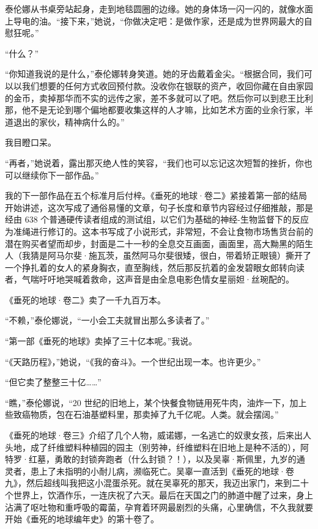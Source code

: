 \documentclass[AutoFakeBold=true]{book}
\begin{document}
泰伦娜从书桌旁站起身，走到地毯圆圈的边缘。她的身体场一闪一闪的，就像水面上导电的油。``接下来，''她说，``你做决定吧：是做作家，还是成为世界网最大的自慰狂呢。''

``什么？''

``你知道我说的是什么，''泰伦娜转身笑道。她的牙齿戴着金尖。``根据合同，我们可以以我们想要的任何方式收回预付款。没收你在银联的资产，收回你藏在自由家园的金币，卖掉那华而不实的远传之家，差不多就可以了吧。然后你可以到悲王比利那，他不是无论到哪个偏地都要收集这样的人才嘛，比如艺术方面的业余行家，半道退出的家伙，精神病什么的。''

我目瞪口呆。

``再者，''她说着，露出那灭绝人性的笑容，``我们也可以忘记这次短暂的挫折，你也可以继续你下一部作品。''

我的下一部作品在五个标准月后付梓。《垂死的地球·卷二》紧接着第一部的结局开始讲述，这次写成了通俗易懂的文章，句子长度和章节内容经过仔细推敲，那是经由 638 个普通硬传读者组成的测试组，以它们为基础的神经-生物监督下的反应为准绳进行修订的。这本书写成了小说形式，非常短，不会让食物市场售货台前的潜在购买者望而却步，封面是二十一秒的全息交互画面，画面里，高大黝黑的陌生人（我猜是阿马尔斐·施瓦茨，虽然阿马尔斐很矮，很白，带着矫正眼镜）撕开了一个挣扎着的女人的紧身胸衣，直至胸线，然后那反抗着的金发碧眼女郎转向读者，气喘吁吁地哭喊着救命，这声音是由全息电影色情女星丽妲·丝琬配的。

《垂死的地球·卷二》卖了一千九百万本。

``不赖，''泰伦娜说，``一小会工夫就冒出那么多读者了。''

``第一部《垂死的地球》卖掉了三十亿本呢。''我说。

``《天路历程》，''她说，``《我的奋斗》。一个世纪出现一本。也许更少。''

``但它卖了整整三十亿……''

``瞧，''泰伦娜说，``20 世纪的旧地上，某个快餐食物链用死牛肉，油炸一下，加上些致癌物质，包在石油基塑料里，那卖掉了九千亿呢。人类。就会摆阔。''

\vspace*{1em}

《垂死的地球·卷三》介绍了几个人物，威诺娜，一名逃亡的奴隶女孩，后来出人头地，成了纤维塑料种植园的园主（别劳神，纤维塑料在旧地上是种不活的），阿特罗·红墓，勇敢的封锁奔跑者（什么封锁？！），以及吴辜·斯佩里，九岁的通灵者，患上了未指明的小耐儿病，濒临死亡。吴辜一直活到《垂死的地球·卷九》，然后超线叫我把这小混蛋杀死。就在吴辜死的那天，我迈出家门，来到二十个世界上，饮酒作乐，一连庆祝了六天。最后在天国之门的肺道中醒了过来，身上沾满了呕吐物和重呼吸的霉菌，孕育着环网最剧烈的头痛，心里确信，不久我就要开始《垂死的地球编年史》的第十卷了。
\end{document}
